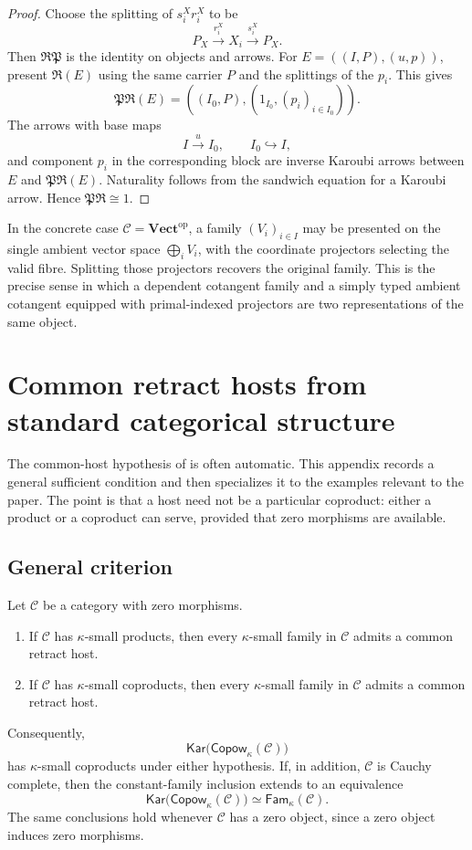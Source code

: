 \documentclass[runningheads,envcountsame]{llncs}
\newcommand{\Vectop}{\mathbf{Vect}^{\mathrm{op}}}
\newcommand{\Copow}{\mathsf{Copow}}
\newcommand{\Fam}{\mathsf{Fam}}
\newcommand{\Kar}{\mathsf{Kar}}
\newcommand{\Rlz}{\mathfrak R}
\newcommand{\Prs}{\mathfrak P}
\begin{document}
\begin{proof}
Choose the splitting of $s_i^Xr_i^X$ to be
$$
P_X\xrightarrow{r_i^X}X_i\xrightarrow{s_i^X}P_X.
$$
Then $\Rlz\Prs$ is the identity on objects and arrows.  For
$E=((I,P),(u,p))$, present $\Rlz(E)$ using the same carrier $P$ and the
splittings of the $p_i$.  This gives
$$
\Prs\Rlz(E)=
\left((I_0,P),(1_{I_0},(p_i)_{i\in I_0})\right).
$$
The arrows with base maps
$$
I\xrightarrow{u}I_0,
\qquad
I_0\hookrightarrow I,
$$
and component $p_i$ in the corresponding block are inverse Karoubi arrows
between $E$ and $\Prs\Rlz(E)$.  Naturality follows from the sandwich equation
for a Karoubi arrow.  Hence $\Prs\Rlz\cong1$.
\end{proof}

In the concrete case $\mathcal C=\Vectop$, a family $(V_i)_{i\in I}$ may be
presented on the single ambient vector space $\bigoplus_iV_i$, with the
coordinate projectors selecting the valid fibre.  Splitting those projectors
recovers the original family.  This is the precise sense in which a dependent
cotangent family and a simply typed ambient cotangent equipped with
primal-indexed projectors are two representations of the same object.


\section{Common retract hosts from standard categorical structure}
\label{app:instances}

The common-host hypothesis of  is often automatic. This
appendix records a general sufficient condition and then specializes it to the
examples relevant to the paper. The point is that a host need not be a
particular coproduct: either a product or a coproduct can serve, provided that
zero morphisms are available.

\subsection{General criterion}

\begin{proposition}
\label{prop:standard-hosts-app}
Let $\mathcal C$ be a category with zero morphisms.
\begin{enumerate}
\item If $\mathcal C$ has $\kappa$-small products, then every
$\kappa$-small family in $\mathcal C$ admits a common retract host.
\item If $\mathcal C$ has $\kappa$-small coproducts, then every
$\kappa$-small family in $\mathcal C$ admits a common retract host.
\end{enumerate}
Consequently,
$$
\Kar\bigl(\Copow_\kappa(\mathcal C)\bigr)
$$
has $\kappa$-small coproducts under either hypothesis. If, in addition,
$\mathcal C$ is Cauchy complete, then the constant-family inclusion extends
to an equivalence
$$
\Kar\bigl(\Copow_\kappa(\mathcal C)\bigr)
\simeq
\Fam_\kappa(\mathcal C).
$$
The same conclusions hold whenever $\mathcal C$ has a zero object, since a
zero object induces zero morphisms.
\end{proposition}
\end{document}
